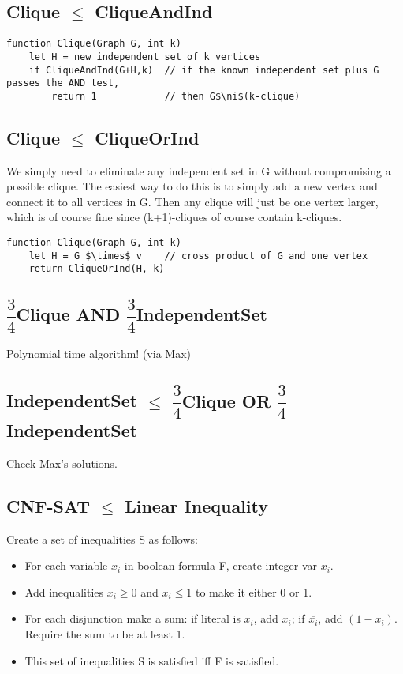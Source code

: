 \documentclass[12pt]{article}
\providecommand{\reducible}[2]{
  \textbf{#1} $\leq$ \textbf{#2}
}
\begin{document}
\subsection{\reducible{Clique}{CliqueAndInd}}
\begin{lstlisting}
function Clique(Graph G, int k)
    let H = new independent set of k vertices
    if CliqueAndInd(G+H,k)  // if the known independent set plus G passes the AND test,
        return 1            // then G$\ni$(k-clique)
\end{lstlisting}


\subsection{\reducible{Clique}{CliqueOrInd}}
We simply need to eliminate any independent set in G without compromising a possible clique.
The easiest way to do this is to simply add a new vertex and connect it to all vertices in G.
Then any clique will just be one vertex larger, which is of course fine since (k+1)-cliques of course contain k-cliques.
\begin{lstlisting}
function Clique(Graph G, int k)
    let H = G $\times$ v    // cross product of G and one vertex
    return CliqueOrInd(H, k)
\end{lstlisting}


\subsection{$\dfrac{3}{4}$Clique AND $\dfrac{3}{4}$IndependentSet}
Polynomial time algorithm! (via Max)

\subsection{\reducible{IndependentSet}{$\dfrac{3}{4}$Clique OR $\dfrac{3}{4}$IndependentSet}}
Check Max's solutions.

\subsection{\reducible{CNF-SAT}{Linear Inequality}}
Create a set of inequalities S as follows:\\
\begin{itemize}
  \item For each variable $x_i$ in boolean formula F, create integer var $x_i$.
  \item Add inequalities $x_i \geq 0$ and $x_i \leq 1$ to make it either 0 or 1.
  \item For each disjunction make a sum: if literal is $x_i$, add $x_i$; if $\overline{x_i}$, add $(1-x_i)$. Require the sum to be at least 1.
  \item This set of inequalities S is satisfied iff F is satisfied.
\end{itemize}
\end{document}
